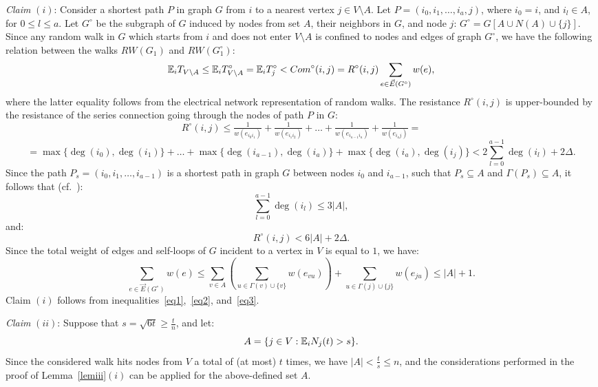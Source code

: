 \documentclass[11pt,a4paper]{article}
\newcommand{\E}{\ensuremath \mathbb E}
\renewcommand{\*}{\hspace*{5mm}}
\begin{document}
\emph{Claim} $(i)$: Consider a shortest path $P$ in graph $G$ from $i$ to a nearest vertex $j \in V\setminus A$. Let $P = (i_0, i_1, \ldots, i_{a}, j)$, where $i_0=i$, and $i_l \in A$,  for $0\leq l \leq a$. Let $G^\circ$ be the subgraph of $G$ induced by nodes from set $A$, their neighbors in $G$, and node $j$: $G^\circ = G [A \cup N(A) \cup \{j\}]$. Since any random walk in $G$ which starts from $i$ and does not enter $V\setminus A$ is confined to nodes and edges of graph $G^\circ$, we have the following relation between the walks $RW(G_1)$ and $RW(G^\circ_1)$:
\begin{equation}\label{eq1}
\E_i T_{V\setminus A} \leq \E_i T^\circ_{V\setminus A} = \E_i T^\circ_j < Com^\circ(i,j) = R^\circ(i,j)\sum_{e \in \vec E(G^\circ)} w(e),
\end{equation}
where the latter equality follows from the electrical network representation of random walks. The resistance $R^\circ(i,j)$ is upper-bounded by the resistance of the series connection going through the nodes of path $P$ in $G$:
$$
R^\circ(i,j) \leq \tfrac{1}{w(e_{i_0 i_1})} + \tfrac{1}{w(e_{i_1 i_2})} + \ldots + \tfrac{1}{w(e_{i_{a-1} i_a})} + \tfrac{1}{w(e_{i_{a} j})} =
$$
$$
= \max\{\deg(i_0),\deg(i_1)\} + \ldots + \max\{\deg(i_{a-1}),\deg(i_a)\} + \max\{\deg(i_{a}),\deg(i_j)\} < 2\sum_{l=0}^{a-1} \deg(i_l) + 2\Delta.
$$
Since the path $P_s = (i_0,i_1,\ldots,i_{a-1})$ is a shortest path in graph $G$ between nodes $i_0$ and $i_{a-1}$, such that $P_s \subseteq A$ and $\Gamma(P_s) \subseteq A$, it follows that (cf.~\cite{AF}):
$$
\sum_{l=0}^{a-1} \deg(i_l) \leq 3 |A|,
$$
and:
\begin{equation}\label{eq2}
R^\circ(i,j) < 6|A| + 2\Delta.
\end{equation}
Since the total weight of edges and self-loops of $G$ incident to a vertex in $V$ is equal to $1$, we have:
\begin{equation}\label{eq3}
\sum_{e \in \vec E(G^\circ)} w(e) \leq \sum_{v\in A} \left( \sum_{u \in \Gamma(v) \cup \{v\}} w(e_{vu}) \right) +  \sum_{u \in \Gamma(j) \cup \{j\}} w(e_{ju}) \leq |A| + 1.
\end{equation}
Claim $(i)$ follows from inequalities~\eqref{eq1},~\eqref{eq2}, and~\eqref{eq3}.

\medskip
\noindent
\emph{Claim} $(ii)$: Suppose that $s = \sqrt {6t} \geq \frac t n$, and let:
$$
A = \{j\in V : \E_i N_j(t) > s\}.
$$
Since the considered walk hits nodes from $V$ a total of (at most) $t$ times, we have $|A| < \frac{t}{s} \leq n$, and the considerations performed in the proof of Lemma~\ref{lemiii}$(i)$ can be applied for the above-defined set $A$.
\end{document}
